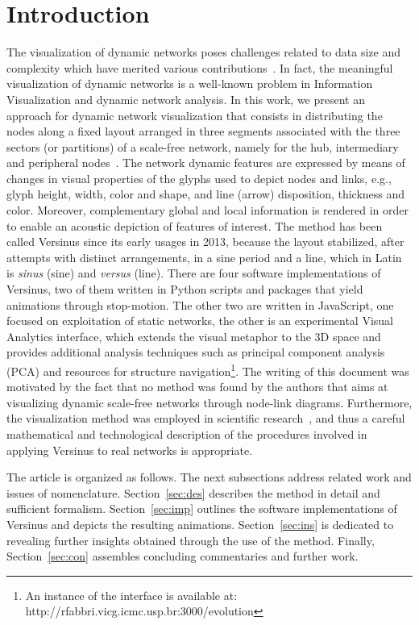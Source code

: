 \documentclass[runningheads]{llncs}
\begin{document}
\section{Introduction}
The visualization of dynamic networks poses challenges related to data size and complexity which have merited various contributions~\cite{evo1,hajij,evo3,evo2}.
In fact, the meaningful visualization of dynamic networks is a well-known problem in Information Visualization and dynamic network analysis.
In this work, we present an approach for dynamic network visualization that consists in distributing the nodes along a fixed layout arranged in three segments associated with the three sectors (or partitions) of a scale-free network, namely for the hub, intermediary and peripheral nodes~\cite{stab}. The network dynamic features are expressed by means of changes in visual properties of the glyphs used to depict nodes and links, e.g., glyph height, width, color and shape, and line (arrow) disposition, thickness and color. Moreover, complementary global and local information is rendered in order to enable an acoustic depiction of features of interest.
The method has been called Versinus since its early usages in 2013, because the layout stabilized, after attempts with distinct arrangements, in a sine period and a line, which in Latin is \emph{sinus} (sine) and \emph{versus} (line). 
There are four software implementations of Versinus, two of them written in Python scripts and packages that yield animations through stop-motion. The other two are written in JavaScript, one focused on exploitation of static networks, the other is an experimental Visual Analytics interface, which extends the visual metaphor to the 3D space and provides additional analysis techniques such as principal component analysis (PCA) and resources for structure navigation\footnote{An instance of the interface is available at: http://rfabbri.vicg.icmc.usp.br:3000/evolution}.
The writing of this document was motivated by
the fact that no method was found by the authors that aims at visualizing dynamic scale-free networks through node-link diagrams.
Furthermore, the visualization method was employed in scientific research~\cite{thesis,stab}, and thus a careful mathematical and technological description of the procedures involved in applying Versinus to real networks is appropriate.

The article is organized as follows. The next subsections address related work and issues of nomenclature. Section~\ref{sec:des} describes the method in detail and sufficient formalism. Section~\ref{sec:imp} outlines the software implementations of Versinus and depicts the resulting animations. Section~\ref{sec:ins} is dedicated to revealing further insights obtained through the use of the method. Finally, Section~\ref{sec:con} assembles concluding commentaries and further work.
\end{document}
